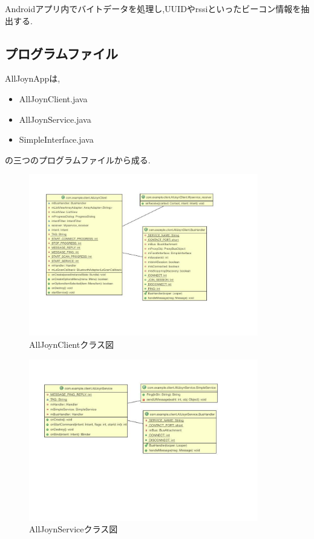 Androidアプリ内でバイトデータを処理し,UUIDやrssiといったビーコン情報を抽出する.


\subsection{プログラムファイル}
AllJoynAppは,
\begin{itemize}
\item AllJoynClient.java
\item AllJoynService.java
\item SimpleInterface.java
\end{itemize}
の三つのプログラムファイルから成る.


\begin{figure}[htbp]
\begin{center}
\includegraphics[width=10cm]{fig/class_client.pdf}
\end{center}
\caption{AllJoynClientクラス図}
\end{figure}

\begin{figure}
\begin{center}
\includegraphics[width=10cm]{fig/class_service.pdf}
\end{center}
\caption{AllJoynServiceクラス図}
\end{figure}

